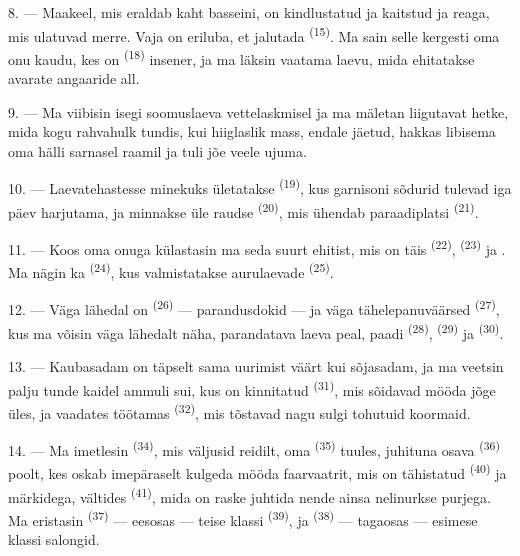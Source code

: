 8. --- Maakeel, mis eraldab kaht basseini, on kindlustatud ja kaitstud
 ja  reaga, mis ulatuvad merre. Vaja on eriluba, et
jalutada  \textsuperscript{(15)}. Ma sain selle kergesti oma onu kaudu,
kes on  \textsuperscript{(18)} insener, ja ma läksin vaatama laevu,
mida ehitatakse avarate angaaride all.

9. --- Ma viibisin isegi soomuslaeva vettelaskmisel ja ma mäletan liigutavat hetke,
mida kogu rahvahulk tundis, kui hiiglaslik mass, endale jäetud, hakkas libisema oma
hälli sarnasel raamil ja tuli jõe veele ujuma.

10. --- Laevatehastesse minekuks ületatakse  \textsuperscript{(19)}, kus
garnisoni sõdurid tulevad iga päev harjutama, ja minnakse üle raudse 
\textsuperscript{(20)}, mis ühendab paraadiplatsi 
\textsuperscript{(21)}.

\VUsaut{3.0mm}
\VUsaut{3.0mm}

11. --- Koos oma onuga külastasin ma seda suurt ehitist, mis on täis 
\textsuperscript{(22)},  \textsuperscript{(23)} ja . Ma nägin
ka  \textsuperscript{(24)}, kus valmistatakse aurulaevade
 \textsuperscript{(25)}.

12. --- Väga lähedal on  \textsuperscript{(26)} --- parandusdokid --- ja
väga tähelepanuväärsed  \textsuperscript{(27)}, kus ma võisin väga
lähedalt näha, parandatava laeva peal, paadi  \textsuperscript{(28)},
 \textsuperscript{(29)} ja  \textsuperscript{(30)}.

13. --- Kaubasadam on täpselt sama uurimist väärt kui sõjasadam, ja ma veetsin palju
tunde kaidel ammuli sui, kus on kinnitatud 
\textsuperscript{(31)}, mis sõidavad mööda jõge üles, ja vaadates töötamas
 \textsuperscript{(32)}, mis tõstavad nagu sulgi tohutuid koormaid.

\VUsaut{4.0mm}
\VUsaut{3.0mm}

14. --- Ma imetlesin  \textsuperscript{(34)}, mis väljusid
reidilt, oma  \textsuperscript{(35)} tuules, juhituna osava
 \textsuperscript{(36)} poolt, kes oskab imepäraselt kulgeda mööda
faarvaatrit, mis on tähistatud  \textsuperscript{(40)} ja märkidega,
vältides  \textsuperscript{(41)}, mida on raske juhtida nende ainsa
nelinurkse purjega. Ma eristasin  \textsuperscript{(37)} --- eesosas ---
teise klassi  \textsuperscript{(39)}, ja 
\textsuperscript{(38)} --- tagaosas --- esimese klassi salongid.

